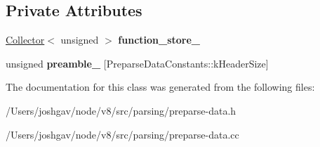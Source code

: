 \subsection*{Private Attributes}
\begin{DoxyCompactItemize}
\item 
\hyperlink{classv8_1_1internal_1_1_collector}{Collector}$<$ unsigned $>$ {\bfseries function\+\_\+store\+\_\+}\hypertarget{classv8_1_1internal_1_1_complete_parser_recorder_a756c3c08190f97ccc152e6eed426a59c}{}\label{classv8_1_1internal_1_1_complete_parser_recorder_a756c3c08190f97ccc152e6eed426a59c}

\item 
unsigned {\bfseries preamble\+\_\+} \mbox{[}Preparse\+Data\+Constants\+::k\+Header\+Size\mbox{]}\hypertarget{classv8_1_1internal_1_1_complete_parser_recorder_a446889d7083bef208180d743eed19e0b}{}\label{classv8_1_1internal_1_1_complete_parser_recorder_a446889d7083bef208180d743eed19e0b}

\end{DoxyCompactItemize}


The documentation for this class was generated from the following files\+:\begin{DoxyCompactItemize}
\item 
/\+Users/joshgav/node/v8/src/parsing/preparse-\/data.\+h\item 
/\+Users/joshgav/node/v8/src/parsing/preparse-\/data.\+cc\end{DoxyCompactItemize}

